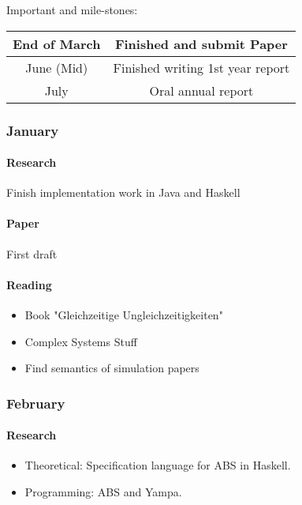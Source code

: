 Important and mile-stones:

\begin{center}
\begin{tabular}{ c|c } 
	End of March & Finished and submit Paper \\ 
	\hline
	June (Mid) & Finished writing 1st year report  \\ 
	\hline
	July & Oral annual report \\
\end{tabular}
\end{center}

\subsubsection{January}
\paragraph{Research} Finish implementation work in Java and Haskell

\paragraph{Paper} First draft
	
\paragraph{Reading}
	\begin{itemize}
		\item Book "Gleichzeitige Ungleichzeitigkeiten"
		\item Complex Systems Stuff
		\item Find semantics of simulation papers
	\end{itemize}
	
\subsubsection{February}
\paragraph{Research}
	\begin{itemize}
		\item Theoretical: Specification language for ABS in Haskell.
		\item Programming: ABS and Yampa.
	\end{itemize}
		
